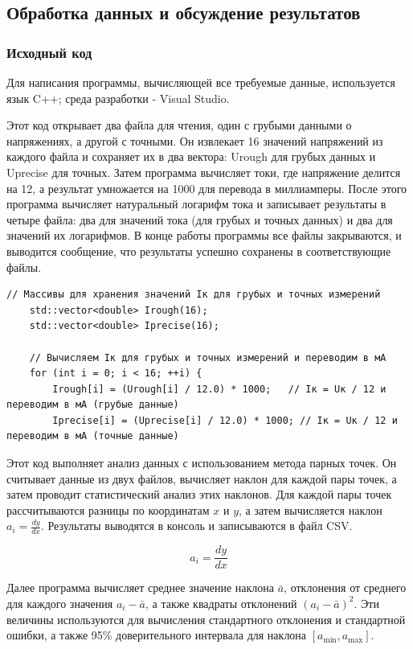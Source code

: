 \subsection{Обработка данных и обсуждение результатов}

\subsubsection{Исходный код}
Для написания программы, вычисляющей все требуемые данные, используется язык C++; среда разработки - Visual Studio.

Этот код открывает два файла для чтения, один с грубыми данными о напряжениях, а другой с точными. Он извлекает 16 значений напряжений из каждого файла и сохраняет их в два вектора: Urough для грубых данных и Uprecise для точных. Затем программа вычисляет токи, где напряжение делится на 12, а результат умножается на 1000 для перевода в миллиамперы.
После этого программа вычисляет натуральный логарифм тока и записывает результаты в четыре файла: два для значений тока (для грубых и точных данных) и два для значений их логарифмов. В конце работы программы все файлы закрываются, и выводится сообщение, что результаты успешно сохранены в соответствующие файлы.

\begin{lstlisting}[label=listing1, caption=Функция вычисления тока]
 // Массивы для хранения значений Iк для грубых и точных измерений
    std::vector<double> Irough(16);
    std::vector<double> Iprecise(16);

    // Вычисляем Iк для грубых и точных измерений и переводим в мА
    for (int i = 0; i < 16; ++i) {
        Irough[i] = (Urough[i] / 12.0) * 1000;   // Iк = Uк / 12 и переводим в мА (грубые данные)
        Iprecise[i] = (Uprecise[i] / 12.0) * 1000; // Iк = Uк / 12 и переводим в мА (точные данные)
\end{lstlisting}

Этот код выполняет анализ данных с использованием метода парных точек. Он считывает данные из двух файлов, вычисляет наклон для каждой пары точек, а затем проводит статистический анализ этих наклонов. Для каждой пары точек рассчитываются разницы по координатам \( x \) и \( y \), а затем вычисляется наклон \( a_i = \frac{dy}{dx} \). Результаты выводятся в консоль и записываются в файл CSV.

\[
a_i = \frac{dy}{dx}
\]

Далее программа вычисляет среднее значение наклона \( \bar{a} \), отклонения от среднего для каждого значения \( a_i - \bar{a} \), а также квадраты отклонений \( (a_i - \bar{a})^2 \). Эти величины используются для вычисления стандартного отклонения и стандартной ошибки, а также 95\% доверительного интервала для наклона \( [a_{\text{min}}, a_{\text{max}}] \).

